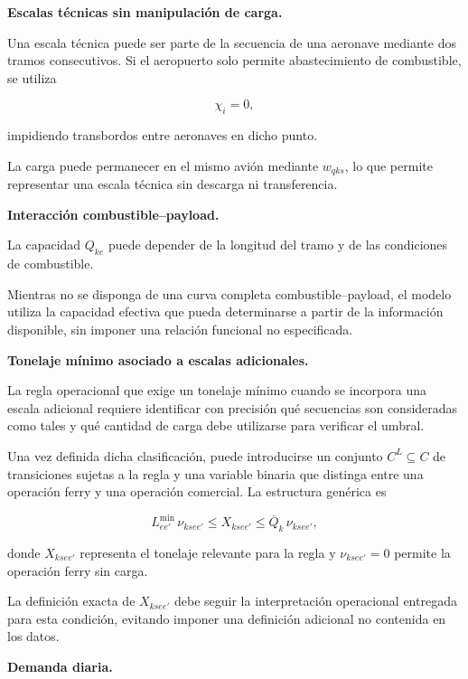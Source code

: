 \vspace{0.5em}
\noindent\textbf{Escalas técnicas sin manipulación de carga.}

Una escala técnica puede ser parte de la secuencia de una aeronave mediante dos tramos
consecutivos. Si el aeropuerto solo permite abastecimiento de combustible, se utiliza

\[
\chi_i=0,
\]

impidiendo transbordos entre aeronaves en dicho punto.

La carga puede permanecer en el mismo avión mediante $w_{qks}$, lo que permite representar
una escala técnica sin descarga ni transferencia.


\vspace{0.5em}
\noindent\textbf{Interacción combustible--payload.}

La capacidad $Q_{ke}$ puede depender de la longitud del tramo y de las condiciones de
combustible.

Mientras no se disponga de una curva completa combustible--payload, el modelo utiliza la
capacidad efectiva que pueda determinarse a partir de la información disponible, sin imponer
una relación funcional no especificada.


\vspace{0.5em}
\noindent\textbf{Tonelaje mínimo asociado a escalas adicionales.}

La regla operacional que exige un tonelaje mínimo cuando se incorpora una escala adicional
requiere identificar con precisión qué secuencias son consideradas como tales y qué cantidad
de carga debe utilizarse para verificar el umbral.

Una vez definida dicha clasificación, puede introducirse un conjunto $C^{L}\subseteq C$ de
transiciones sujetas a la regla y una variable binaria que distinga entre una operación ferry
y una operación comercial. La estructura genérica es

\[
L_{ee'}^{\min}\,\nu_{ksee'}
\leq
X_{ksee'}
\leq
\overline{Q}_{k}\,\nu_{ksee'},
\]

donde $X_{ksee'}$ representa el tonelaje relevante para la regla y
$\nu_{ksee'}=0$ permite la operación ferry sin carga.

La definición exacta de $X_{ksee'}$ debe seguir la interpretación operacional entregada para
esta condición, evitando imponer una definición adicional no contenida en los datos.


\vspace{0.5em}
\noindent\textbf{Demanda diaria.}

